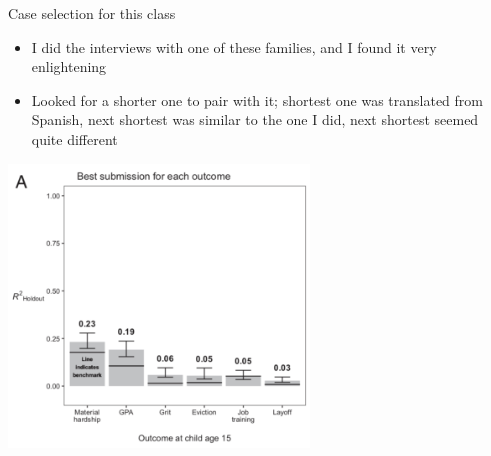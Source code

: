 \documentclass[aspectratio=169]{beamer}
\begin{document}
\begin{frame}

\begin{center}
{\Large Case selection for this class}
\end{center}

\end{frame}
\begin{frame}

\begin{itemize}
\item I did the interviews with one of these families, and I found it very enlightening
\pause
\item Looked for a shorter one to pair with it; shortest one was translated from Spanish, next shortest was similar to the one I did, next shortest seemed quite different
\end{itemize}

\end{frame}
\begin{frame}

\begin{center}
\includegraphics[width = 0.6\textwidth]{figures/salganik_measuring_2020_fig2a}
\end{center}

\end{frame}
\frame{\titlepage}
\end{document}
